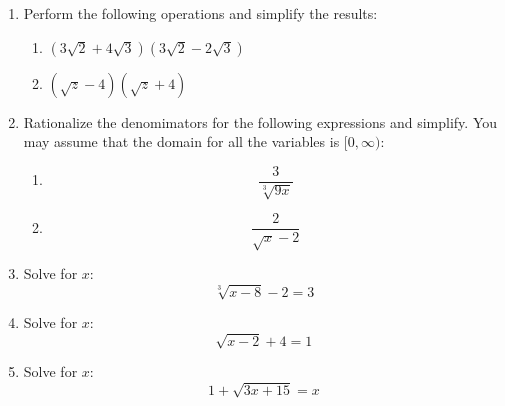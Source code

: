 \documentclass[letterpaper,12pt,fleqn]{article}
\begin{document}
\begin{enumerate}
\item Perform the following operations and simplify the results:
  \begin{enumerate}
  \item $(3\sqrt{2}+4\sqrt{3})(3\sqrt{2}-2\sqrt{3})$
  \item $(\sqrt{z}-4)(\sqrt{z}+4)$
  \end{enumerate}

\item Rationalize the denomimators for the following expressions and simplify. You may
  assume that the domain for all the variables is $[0,\infty)$:
  \begin{enumerate}
  \item \[\frac{3}{\sqrt[3]{9x}}\]
  \item \[\frac{2}{\sqrt{x}-2}\]
  \end{enumerate}
  
\item Solve for $x$:
  \[\sqrt[3]{x-8}-2=3\]
      
\item Solve for $x$:
  \[\sqrt{x-2}+4=1\]

\item Solve for $x$:
  \[1+\sqrt{3x+15}=x\]
\end{enumerate}
\end{document}
